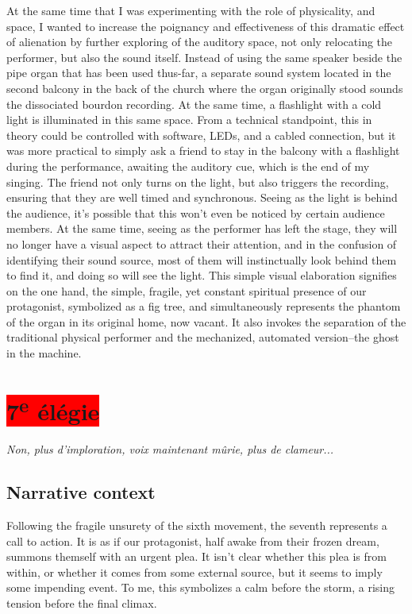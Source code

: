 \documentclass[12pt,twoside,maitrise]{dms_ks}
\theoremstyle{definition}
\begin{document}
{At the same time that I was experimenting with the role of physicality, and space, I wanted to increase the poignancy and effectiveness of this dramatic effect of alienation by further exploring of the auditory space, not only relocating the performer, but also the sound itself.
Instead of using the same speaker beside the pipe organ that has been used thus-far, a separate sound system located in the second balcony in the back of the church where the organ originally stood sounds the dissociated bourdon recording.
At the same time, a flashlight with a cold light is illuminated in this same space.
From a technical standpoint, this in theory could be controlled with software, LEDs, and a cabled connection, but it was more practical to simply ask a friend to stay in the balcony with a flashlight during the performance, awaiting the auditory cue, which is the end of my singing.
The friend not only turns on the light, but also triggers the recording, ensuring that they are well timed and synchronous.
Seeing as the light is behind the audience, it's possible that this won't even be noticed by certain audience members.
At the same time, seeing as the performer has left the stage, they will no longer have a visual aspect to attract their attention, and in the confusion of identifying their sound source, most of them will instinctually look behind them to find it, and doing so will see the light.
This simple visual elaboration signifies on the one hand, the simple, fragile, yet constant spiritual presence of our protagonist, symbolized as a fig tree, and simultaneously represents the phantom of the organ in its original home, now vacant.
It also invokes the separation of the traditional physical performer and the mechanized, automated version--the ghost in the machine.

\section{\colorbox{red}{7\textsuperscript{e} élégie}}

\epigraph{\textit{Non, plus d’imploration, voix maintenant mûrie, plus de clameur...}}{}

\subsection{Narrative context}

Following the fragile unsurety of the sixth movement, the seventh represents a call to action. It is as if our protagonist, half awake from their frozen dream, summons themself with an urgent plea. It isn’t clear whether this plea is from within, or whether it comes from some external source, but it seems to imply some impending event. To me, this symbolizes a calm before the storm, a rising tension before the final climax. 

}
\end{document}
